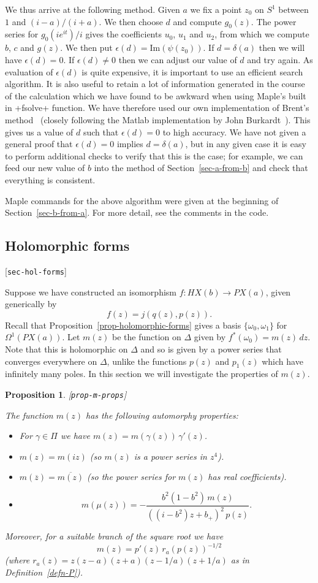 \documentclass[reqno]{amsart}
\newcommand{\lbl}[1]{\label{#1}\textup{[\texttt{#1}]}\par}
\newcommand{\lbl}{\label}
\newcommand{\Dl}        {\Delta}
\newcommand{\Om}        {\Omega}
\newcommand{\gm}        {\gamma}
\newcommand{\dl}        {\delta}
\newcommand{\ep}        {\epsilon}
\newcommand{\om}        {\omega}
\newcommand{\ov}[1]     {\overline{#1}}
\renewcommand{\:}{\colon}
\newtheorem{proposition}[theorem]{Proposition}
\theoremstyle{definition}
\begin{document}
We thus arrive at the following method.  Given $a$ we fix a point
$z_0$ on $S^1$ between $1$ and $(i-a)/(i+a)$.  We then choose $d$ and
compute $g_0(z)$.  The power series for $g_0(ie^{it})/i$ gives the
coefficients $u_0$, $u_1$ and $u_2$, from which we compute $b$, $c$
and $g(z)$.  We then put $\ep(d)=\text{Im}(\psi(z_0))$.  If $d=\dl(a)$
then we will have $\ep(d)=0$.  If $\ep(d)\neq 0$ then we can adjust
our value of $d$ and try again.  As evaluation of $\ep(d)$ is quite
expensive, it is important to use an efficient search algorithm.  It
is also useful to retain a lot of information generated in the course
of the calculation which we have found to be awkward when using
Maple's built in \mcode+fsolve+ function.  We have therefore used our
own implementation of Brent's method~\cite{br:amw} (closely following
the Matlab implementation by John Burkardt~\cite{bu:br}).  This gives
us a value of $d$ such that $\ep(d)=0$ to high accuracy.  We have not
given a general proof that $\ep(d)=0$ implies $d=\dl(a)$, but in any
given case it is easy to perform additional checks to verify that this
is the case; for example, we can feed our new value of $b$ into the
method of Section~\ref{sec-a-from-b} and check that everything is
consistent.

Maple commands for the above algorithm were given at the beginning of
Section~\ref{sec-b-from-a}.  For more detail, see the comments in the
code.

\subsection{Holomorphic forms}
\lbl{sec-hol-forms}

Suppose we have constructed an isomorphism $f\:HX(b)\to PX(a)$, given
generically by
\[ f(z)=j(q(z),p(z)). \]
Recall that Proposition~\ref{prop-holomorphic-forms} gives a basis
$\{\om_0,\om_1\}$ for $\Om^1(PX(a))$.  Let $m(z)$ be the function on
$\Dl$ given by $f^*(\om_0)=m(z)\,dz$.  Note that this is holomorphic
on $\Dl$ and so is given by a power series that converges everywhere
on $\Dl$, unlike the functions $p(z)$ and $p_1(z)$ which have
infinitely many poles.  In this section we will investigate the
properties of $m(z)$.

\begin{proposition}\lbl{prop-m-props}
 The function $m(z)$ has the following automorphy properties:
 \begin{itemize}
  \item[(a)] For $\gm\in\Pi$ we have $m(z)=m(\gm(z))\,\gm'(z)$.
  \item[(b)] $m(z)=m(iz)$ (so $m(z)$ is a power series in $z^4$).
  \item[(c)] $m(\ov{z})=\ov{m(z)}$ (so the power series for $m(z)$ has
   real coefficients).
  \item[(d)]
   \[ m(\mu(z)) = -\frac{b^2(1-b^2)\,m(z)}{((i-b^2)z+b_+)^2\,p(z)}.
   \]
 \end{itemize}
 Moreover, for a suitable branch of the square root we have
 \[ m(z) = p'(z)\, r_a(p(z))^{-1/2} \]
 (where $r_a(z)=z(z-a)(z+a)(z-1/a)(z+1/a)$ as in
 Definition~\ref{defn-P}).
\end{proposition}
\end{document}
